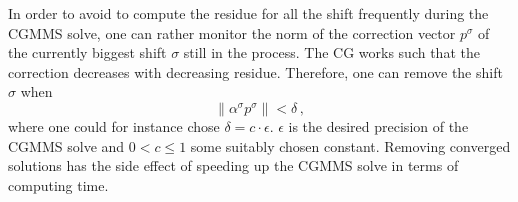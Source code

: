 In order to avoid to compute the residue for all the shift frequently
during the CGMMS solve, one can rather monitor the norm of the
correction vector $p^\sigma$ of the currently biggest shift $\sigma$
still in the process. The CG works such that the correction decreases
with decreasing residue. Therefore, one can remove the shift $\sigma$
when
\[
\|\alpha^\sigma p^\sigma\| < \delta\,,
\]
where one could for instance chose $\delta =
c\cdot\epsilon$. $\epsilon$ is the desired precision of the CGMMS
solve and $0<c\leq1$ some suitably chosen constant. Removing converged
solutions has the side effect of speeding up the CGMMS solve in terms
of computing time.

